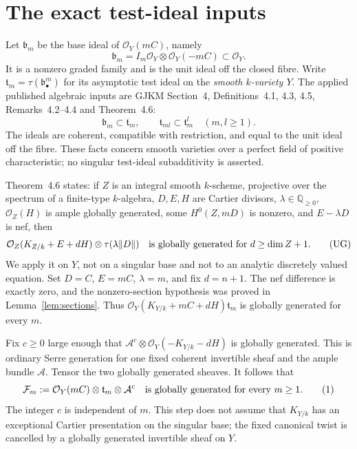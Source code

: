 \documentclass[11pt]{article}
\newcommand{\OO}{\mathcal O}
\begin{document}
\section{The exact test-ideal inputs}
Let $\mathfrak b_m$ be the base ideal of $\OO_Y(mC)$, namely
\[
 \mathfrak b_m=I_m\OO_Y\otimes\OO_Y(-mC)\subset\OO_Y.
\]
It is a nonzero graded family and is the unit ideal off the closed fibre.
Write $\mathfrak t_m=\tau(\mathfrak b_\bullet^m)$ for its asymptotic
test ideal on the \emph{smooth $k$-variety $Y$}. The applied published
algebraic inputs are GJKM Section~4, Definitions~4.1, 4.3, 4.5,
Remarks~4.2--4.4 and Theorem~4.6:
\[
 \mathfrak b_m\subset\mathfrak t_m,\qquad
 \mathfrak t_{ml}\subset\mathfrak t_m^l\quad(m,l\geq1).
\tag{TI}
\]
The ideals are coherent, compatible with restriction, and equal to the
unit ideal off the fibre. These facts concern smooth varieties over a
perfect field of positive characteristic; no singular test-ideal
subadditivity is asserted.

Theorem~4.6 states: if $Z$ is an integral smooth $k$-scheme, projective
over the spectrum of a finite-type $k$-algebra, $D,E,H$ are Cartier
divisors, $\lambda\in\mathbb Q_{\geq0}$, $\OO_Z(H)$ is ample globally
generated, some $H^0(Z,mD)$ is nonzero, and $E-\lambda D$ is nef, then
\[
 \OO_Z(K_{Z/k}+E+dH)\otimes\tau(\lambda\Vert D\Vert)
\quad\hbox{is globally generated for }d\geq\dim Z+1.
\tag{UG}
\]
We apply it on $Y$, not on a singular base and not to an analytic
discretely valued equation. Set $D=C$, $E=mC$, $\lambda=m$, and fix
$d=n+1$. The nef difference is exactly zero, and the nonzero-section
hypothesis was proved in Lemma~\ref{lem:sections}. Thus
$\OO_Y(K_{Y/k}+mC+dH)\mathfrak t_m$ is globally generated for every $m$.

Fix $c\geq0$ large enough that
$\mathcal A^c\otimes\OO_Y(-K_{Y/k}-dH)$ is globally generated. This is
ordinary Serre generation for one fixed coherent invertible sheaf and
the ample bundle $\mathcal A$. Tensor the two globally generated sheaves.
It follows that
\[
 \mathcal F_m:=\OO_Y(mC)\otimes\mathfrak t_m\otimes\mathcal A^c
 \quad\hbox{is globally generated for every }m\geq1.
\tag{1}
\]
The integer $c$ is independent of $m$. This step does not assume that
$K_{Y/k}$ has an exceptional Cartier presentation on the singular base;
the fixed canonical twist is cancelled by a globally generated invertible
sheaf on $Y$.
\end{document}
